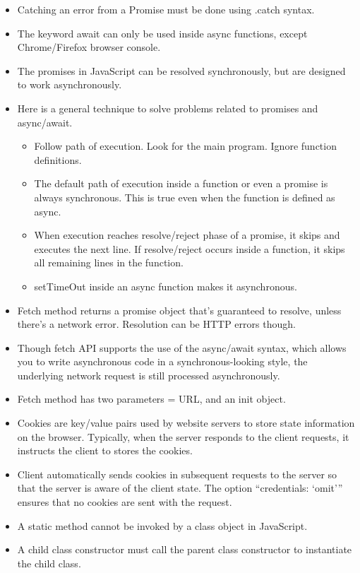 \documentclass[a4paper]{article}
\begin{document}
\begin{enumerate}
\begin{itemize}
        \item Catching an error from a Promise must be done using .catch  syntax.
        \item The keyword await can only be used inside async functions, except Chrome/Firefox browser console.
        \item The promises in JavaScript can be resolved synchronously, but are designed to work asynchronously.
        \item Here is a general technique to solve problems related to promises and async/await.
        \begin{itemize}
            \item Follow path of execution. Look for the  main program. Ignore function definitions.
            \item The default path of execution inside a function or even a promise is always synchronous. This is true even when the function is defined as async.
            \item When execution reaches resolve/reject phase of a promise, it skips and executes the next line. If resolve/reject occurs inside a function, it skips all remaining lines in the function.
            \item setTimeOut inside an async function makes it asynchronous.
        \end{itemize}
        \item Fetch method returns a promise object that’s guaranteed to resolve, unless there’s a network error. Resolution can be HTTP errors though.
        \item Though fetch API supports the use of the async/await syntax, which allows you to write asynchronous code in a synchronous-looking style, the underlying network request is still processed asynchronously.
        \item Fetch  method has two parameters = URL, and an init  object.
        \item Cookies are key/value pairs used by website servers to store state information on the browser.  Typically, when the server responds to the client requests, it instructs the client to stores the cookies.
        \item Client automatically sends cookies in subsequent requests to the server so that the server is aware of the client state. The option “credentials: ‘omit’” ensures that no cookies are sent with the request.
        \item A static method cannot be invoked by a class object in JavaScript.
        \item A child class constructor must call the parent class constructor to instantiate the child class.

\end{itemize}
\end{enumerate}
\end{document}
